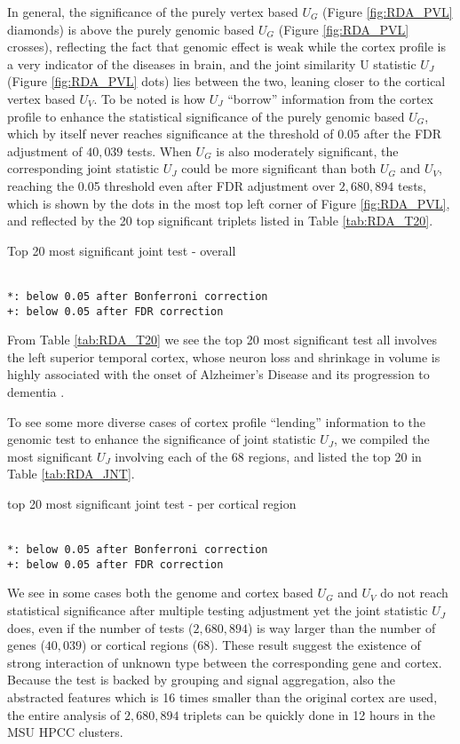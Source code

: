 In general, the significance of the purely vertex based $U_G$ (Figure \ref{fig:RDA_PVL} diamonds) is above the purely genomic based $U_G$ (Figure \ref{fig:RDA_PVL} crosses), reflecting the fact that genomic effect is weak while the cortex profile is a very indicator of the diseases in brain, and the joint similarity U statistic $U_J$ (Figure \ref{fig:RDA_PVL} dots) lies between the two, leaning closer to the cortical vertex based $U_V$. To be noted is how $U_J$ ``borrow'' information from the cortex profile to enhance the statistical significance of the purely genomic based $U_G$, which by itself never reaches significance at the threshold of $0.05$ after the FDR adjustment of $40,039$ tests. When $U_G$ is also moderately significant, the corresponding joint statistic $U_J$ could be more significant than both $U_G$ and $U_V$, reaching the 0.05 threshold even after FDR adjustment over $2,680,894$ tests, which is shown by the dots in the most top left corner of Figure \ref{fig:RDA_PVL}, and reflected by the 20 top significant triplets listed in Table \ref{tab:RDA_T20}.
\begin{table}[!htbp]
\centering
\small
\caption{Top 20 most significant joint test - overall}
\label{tab:RDA_T20}
 \\
\texttt{*: below 0.05 after Bonferroni correction} \\
\texttt{+: below 0.05 after FDR correction}
\end{table}
From Table \ref{tab:RDA_T20} we see the top 20 most significant test all involves the left superior temporal cortex, whose neuron loss and shrinkage in volume is highly associated with the onset of Alzheimer's Disease and its progression to dementia \cite{AD:ST1}. 

To see some more diverse cases of cortex profile ``lending'' information to the genomic test to enhance the significance of joint statistic $U_J$, we compiled the most significant $U_J$ involving each of the 68 regions, and listed the top 20 in Table \ref{tab:RDA_JNT}.
\begin{table}[!htbp]
\centering
\small
\caption{top 20 most significant joint test - per cortical region}
\label{tab:RDA_JNT}
 \\
\texttt{*: below 0.05 after Bonferroni correction} \\
\texttt{+: below 0.05 after FDR correction}
\end{table}
We see in some cases both the genome and cortex based $U_G$ and $U_V$ do not reach statistical significance after multiple testing adjustment yet the joint statistic $U_J$ does, even if the number of tests ($2,680,894$) is way larger than the number of genes ($40,039$) or cortical regions ($68$). These result suggest the existence of strong interaction of unknown type between the corresponding gene and cortex. Because the test is backed by grouping and signal aggregation, also the abstracted features which is 16 times smaller than the original cortex are used, the entire analysis of $2,680,894$ triplets can be quickly done in 12 hours in the MSU HPCC clusters.